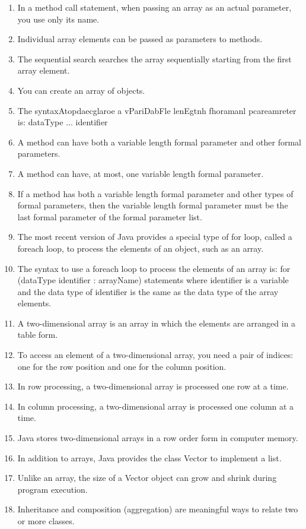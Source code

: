 \documentclass[12pt,a4paper,final,twoside,onecolumn,titlepage]{book}
\begin{document}
\begin{enumerate}
\item In a method call statement, when passing an array as an actual parameter, you use only its name.
\item Individual array elements can be passed as parameters to methods.
\item The sequential search searches the array sequentially starting from the first array element.
\item You can create an array of objects.
\item The syntaxAtopdaecglaroe a vPariDabFle lenEgtnh fhoramanl pcareamreter is: dataType ... identifier
\item A method can have both a variable length formal parameter and other formal parameters.
\item A method can have, at most, one variable length formal parameter.
\item If a method has both a variable length formal parameter and other types of formal parameters, then the variable length formal parameter must be the last formal parameter of the formal parameter list.
\item The most recent version of Java provides a special type of for loop, called a foreach loop, to process the elements of an object, such as an array.
\item The syntax to use a foreach loop to process the elements of an array is: for (dataType identifier : arrayName)
statements where identifier is a variable and the data type of identifier is the same as the data type of the array elements.
\item A two-dimensional array is an array in which the elements are arranged in a table form.
\item To access an element of a two-dimensional array, you need a pair of indices: one for the row position and one for the column position.
\item In row processing, a two-dimensional array is processed one row at a time.
\item In column processing, a two-dimensional array is processed one column at a time.
\item Java stores two-dimensional arrays in a row order form in computer memory.
\item In addition to arrays, Java provides the class Vector to implement a list.
\item Unlike an array, the size of a Vector object can grow and shrink during program execution.
\item Inheritance and composition (aggregation) are meaningful ways to relate two or more classes.

\end{enumerate}
\end{document}
